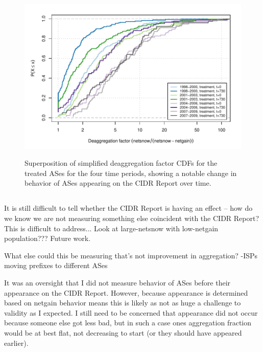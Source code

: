 \begin{figure}[H]
\begin{centering}
\begin{singlespace}
    \includegraphics[width=6in]{figures/behavior-deagg_factor-all-special_t.pdf}
    \vspace{-2em}\\
    \caption{Superposition of simplified deaggregation factor CDFs for the
    treated ASes for the four time periods, showing a notable change in
    behavior of ASes appearing on the CIDR Report over time.}
    \label{fig:deagg_factor_cdf_treatment}
\end{singlespace}
\end{centering}
\end{figure}


\subsection{}
It is still difficult to tell whether the CIDR Report is having an effect -- how
do we know we are not measuring something else coincident with the CIDR Report?
This is difficult to address... Look at large-netsnow with low-netgain
population??? Future work.

What else could this be measuring that's not improvement in aggregation?
-ISPs moving prefixes to different ASes


It was an oversight that I did not measure behavior of ASes before their
appearance on the CIDR Report. However, because appearance is determined based
on netgain behavior means this is likely as not as huge a challenge to validity
as I expected. I still need to be concerned that appearance did not occur
because someone else got less bad, but in such a case ones aggregation
fraction would be at best flat, not decreasing to start (or they should have
appeared earlier).

